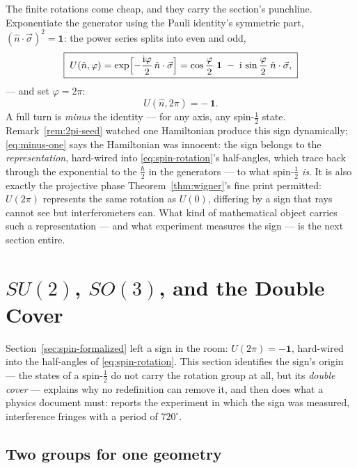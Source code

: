\documentclass[11pt]{article}
\theoremstyle{plain}
\theoremstyle{definition}
\theoremstyle{remark}
\newcommand{\ii}{\mathrm{i}}
\newcommand{\idop}{\mathbf{1}}  %
\begin{document}
The finite rotations come cheap, and they carry the section's
punchline. Exponentiate the generator using the Pauli identity's
symmetric part, $(\hat n\cdot\vec\sigma)^2 = \idop$: the power
series splits into even and odd,
\begin{equation}
  \boxed{\;
  U(\hat n, \varphi)
  = \exp\Bigl[
      -\frac{\ii\varphi}{2}\,\hat n\cdot\vec\sigma
    \Bigr]
  = \cos\frac\varphi2\;\idop
  \;-\; \ii\,\sin\frac\varphi2\;\hat n\cdot\vec\sigma ,
  \;}
  \label{eq:spin-rotation}
\end{equation}
--- and set $\varphi = 2\pi$:
\begin{equation}
  U(\hat n, 2\pi) = -\,\idop .
  \label{eq:minus-one}
\end{equation}
A full turn is \emph{minus} the identity --- for any axis, any
spin-$\tfrac12$ state. Remark~\ref{rem:2pi-seed} watched one
Hamiltonian produce this sign dynamically; \eqref{eq:minus-one}
says the Hamiltonian was innocent: the sign belongs to the
\emph{representation}, hard-wired into \eqref{eq:spin-rotation}'s
half-angles, which trace back through the exponential to the
$\tfrac\hbar2$ in the generators --- to what spin-$\tfrac12$
\emph{is}. It is also exactly the projective phase
Theorem~\ref{thm:wigner}'s fine print permitted: $U(2\pi)$
represents the same rotation as $U(0)$, differing by a sign that
rays cannot see but interferometers can. What kind of mathematical
object carries such a representation --- and what experiment
measures the sign --- is the next section entire.


\section{$SU(2)$, $SO(3)$, and the Double Cover}
\label{sec:su2}

Section~\ref{sec:spin-formalized} left a sign in the room:
$U(2\pi) = -\idop$, hard-wired into the half-angles of
\eqref{eq:spin-rotation}. This section identifies the sign's origin
--- the states of a spin-$\tfrac12$ do not carry the rotation group
at all, but its \emph{double cover} --- explains why no redefinition
can remove it, and then does what a physics document must: reports
the experiment in which the sign was measured, interference fringes
with a period of $720^\circ$.

\subsection{Two groups for one geometry}
\label{sec:two-groups}
\end{document}
